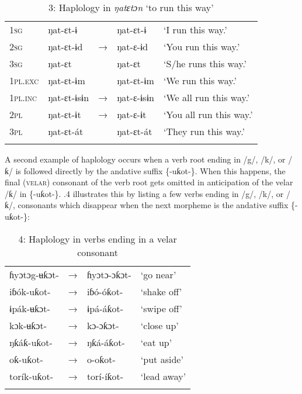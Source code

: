 \begin{table}
\caption{3: Haplology in \textit{ŋatɛtɔn} ‘to run this way’}
\label{tab:2}


\begin{tabularx}{\textwidth}{XXXXX}
\lsptoprule

\textsc{1sg} & ŋat-ɛt-ɨ &  & ŋat-ɛt-ɨ & ‘I run this way.’\\
\textsc{2sg} & ŋat-ɛt-ɨd & → & ŋat-ɛ{}-ɨd & ‘You run this way.’\\
\textsc{3sg} & ŋat-ɛt &  & ŋat-ɛt & ‘S/he runs this way.’\\
\textsc{1pl.exc} & ŋat-ɛt-ɨm &  & ŋat-ɛt-ɨm & ‘We run this way.’\\
\textsc{1pl.inc} & ŋat-ɛt-ɨsɨn & → & ŋat-ɛ{}-ɨsɨn & ‘We all run this way.’\\
\textsc{2pl} & ŋat-ɛt-ɨt & → & ŋat-ɛ{}-ɨt & ‘You all run this way.’\\
\textsc{3pl} & ŋat-ɛt-át &  & ŋat-ɛt-át & ‘They run this way.’\\
\lspbottomrule
\end{tabularx}
\end{table}

A second example of haplology occurs when a verb root ending in /g/, /k/, or /ƙ/ is followed directly by the andative\textsc{} suffix \{-uƙot-\}. When this happens, the final (\textsc{velar}) consonant of the verb root gets omitted in anticipation of the velar /ƙ/ in \{-uƙot-\}. .4 illustrates this by listing a few verbs ending in /g/, /k/, or /ƙ/, consonants which disappear when the next morpheme is the andative\textsc{} suffix \{-uƙot-\}:


\begin{table}
\caption{4: Haplology in verbs ending in a velar consonant}
\label{tab:2}


\begin{tabularx}{\textwidth}{XXXX}
\lsptoprule

ɦyɔtɔg-ʉƙɔt- & → & ɦyɔtɔ-ɔƙɔt- & ‘go near’\\
iɓók-uƙot- & → & iɓó-óƙot- & ‘shake off’\\
ɨpák-ʉƙɔt- & → & ɨpá-áƙot- & ‘swipe off’\\
kɔk-ʉƙɔt- & → & kɔ-ɔƙɔt- & ‘close up’\\
ŋƙáƙ-uƙot- & → & ŋƙá-áƙot- & ‘eat up’\\
oƙ-uƙot- & → & o-oƙot- & ‘put aside’\\
torík-uƙot- & → & torí-íƙot- & ‘lead away’\\
\lspbottomrule
\end{tabularx}
\end{table}

